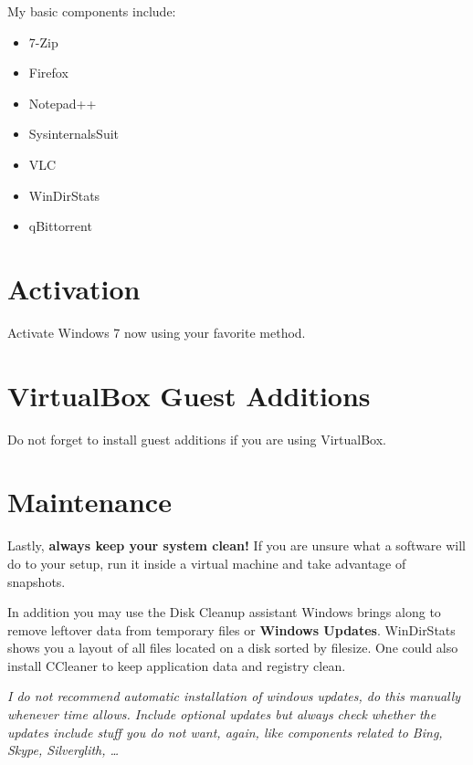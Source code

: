 \documentclass{itsarticle}
\begin{document}
My basic components include:

\begin{itemize}
    \item 7-Zip
    \item Firefox
    \item Notepad++
    \item SysinternalsSuit
    \item VLC
    \item WinDirStats
    \item qBittorrent
\end{itemize}

\section{Activation}
\label{sec:activation}

Activate Windows 7 now using your favorite method.

\section{VirtualBox Guest Additions}
\label{sec:guest_additions}

Do not forget to install guest additions if you are using VirtualBox.

\section{Maintenance}
\label{sec:maintenance}

Lastly, \textbf{always keep your system clean!} If you are unsure what a
software will do to your setup, run it inside a virtual machine and take
advantage of snapshots.

In addition you may use the Disk Cleanup assistant Windows brings along to
remove leftover data from temporary files or \textbf{Windows Updates}.
WinDirStats shows you a layout of all files located on a disk sorted by
filesize. One could also install CCleaner to keep application data and registry
clean.

\textit{I do not recommend automatic installation of windows updates, do this
manually whenever time allows. Include optional updates but always check
whether the updates include stuff you do not want, again, like components
related to Bing, Skype, Silverglith, \ldots}
\end{document}
